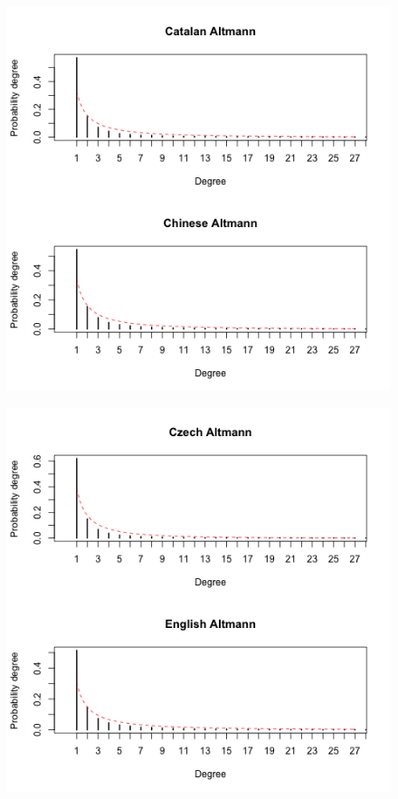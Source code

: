 \documentclass[paper=a4, fontsize=11pt]{scrartcl} %
\theoremstyle{plain}
\begin{document}
\begin{figure}[htbp] %
   \centering
   \includegraphics[width=\textwidth]{Altman_2} %
\end{figure}

\begin{figure}[htbp] %
   \centering
   \includegraphics[width=\textwidth]{Altman_3} %
\end{figure}
\end{document}
